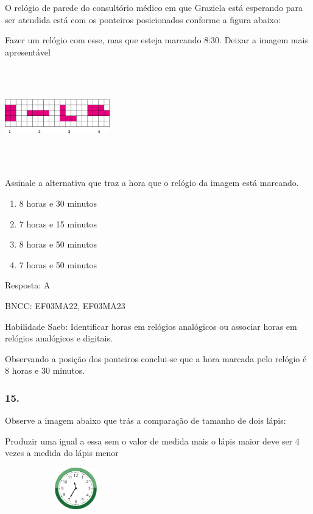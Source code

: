 O relógio de parede do consultório médico em que Graziela está esperando
para ser atendida está com os ponteiros posicionados conforme a figura
abaixo:

Fazer um relógio com esse, mas que esteja marcando 8:30. Deixar a imagem
mais apresentável

\includegraphics[width=1.79182in,height=1.69181in]{media/image115.png}

Assinale a alternativa que traz a hora que o relógio da imagem está
marcando.

\begin{enumerate}
\def\labelenumi{\alph{enumi})}
\item
  8 horas e 30 minutos
\item
  7 horas e 15 minutos
\item
  8 horas e 50 minutos
\item
  7 horas e 50 minutos
\end{enumerate}

Resposta: A

BNCC: EF03MA22, EF03MA23

Habilidade Saeb: Identificar horas em relógios analógicos ou associar
horas em relógios analógicos e digitais.

Observando a posição dos ponteiros conclui-se que a hora marcada pelo
relógio é 8 horas e 30 minutos.

\subsubsection{15.}\label{section-140}

Observe a imagem abaixo que trás a comparação de tamanho de dois lápis:

Produzir uma igual a essa sem o valor de medida mais o lápis maior deve
ser 4 vezes a medida do lápis menor

\includegraphics[width=2.43137in,height=0.71356in]{media/image116.png}

